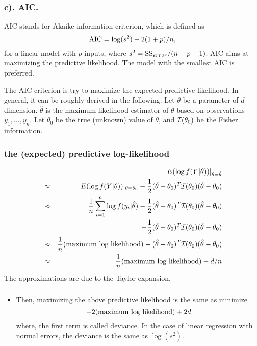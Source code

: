 \documentclass{beamer}
\begin{document}
      \begin{frame}
      	\frametitle{c). AIC.}
      	
      	
      	AIC stands for Akaike information criterion, which is defined as
      	$$\hbox{AIC} =   \log(s^2) + 2(1+p)/n, $$
      	for a linear model with $p$ inputs, where $s^2  = \hbox{SS}_{error} /(n-p-1)$.
      	AIC aims at maximizing the predictive likelihood.
      	The model with the smallest AIC is preferred.
      	
      	The AIC criterion is try to maximize the expected 
      	predictive likelihood. In general, it can be roughly derived in the following.
      	Let $\theta $ be a parameter of $d$ dimension. $\hat \theta $ is the maximum likelihood estimator of $\theta$
      	based on observations $y_1, ..., y_n$. Let $\theta_0$ be the true (unknown) value of $\theta$, and 
      	${\cal I}(\theta_0)$ be the
      	Fisher information. 
      	
      \end{frame}
      
      
      \begin{frame}
      	\frametitle{ the (expected) predictive log-likelihood }
      	\begin{eqnarray*}
      		&&
      		E(\log f(Y|\theta)) |_{\theta= \hat \theta}
      		\\
      		&\approx& E(\log f(Y|\theta)) |_{\theta=  \theta_0} -{1 \over 2} (\hat \theta- \theta_0)^T {\cal I} (\theta_0) 
      		(\hat \theta - \theta_0)
      		\\
      		&\approx& {1 \over n} \sum_{i=1}^n \log f(y_i | \hat \theta) -  {1 \over 2} (\hat \theta- \theta_0)^T {\cal I} (\theta_0) 
      		(\hat \theta - \theta_0)
      		\\ &&  -{1 \over 2} (\hat \theta- \theta_0)^T {\cal I} (\theta_0) 
      		(\hat \theta - \theta_0)
      		\\
      		&\approx& {1 \over n} \hbox{(maximum log likelihood)} -   (\hat \theta- \theta_0)^T {\cal I} (\theta_0) 
      		(\hat \theta - \theta_0) 
      		\\
      		&\approx& {1 \over n} \hbox{(maximum log likelihood)} -   d/n
      	\end{eqnarray*}	
      	The approximations are due to the Taylor expansion. 
      \end{frame}
      

      
      \begin{frame}
      	\frametitle{  }
      	\begin{itemize}
      		
      		\item  Then, maximizing the above predictive likelihood
      		is the same as 
      		minimize
      		$$ -2 \hbox{(maximum log likelihood)} +  2 d $$
      		where, the first term is called deviance. In the case of linear regression with normal errors, the deviance
      		is the same as $\log(s^2)$. 
      		
      		
      		
      	\end{itemize}
      \end{frame}
      
\end{document}
